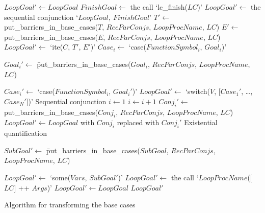 \begin{algorithm}[tbp]
\begin{algorithmic}
    \State $LoopGoal' \gets LoopGoal$
    \State $FinishGoal \gets$ the call `lc\_finish($LC$)'
    \State $LoopGoal' \gets$ the sequential conjunction
      `$LoopGoal,~FinishGoal$'
  \Else
        \State $T' \gets$ put\_barriers\_in\_base\_cases($T$,
          $RecParConjs$, $LoopProcName$, $LC$)
        \State $E' \gets$ put\_barriers\_in\_base\_cases($E$,
          $RecParConjs$, $LoopProcName$, $LC$)
        \State $LoopGoal' \gets$ `ite($C$, $T'$, $E'$)'
      \EndCase
          \State $Case_i \gets$ `case($FunctionSymbol_i$, $Goal_i$)'
          \State \parbox{0.7\textwidth}{
            \begin{tabbing}
              $Goal_i' \gets$ \=put\_barriers\_in\_base\_cases($Goal_i$,
                $RecParConjs$, $LoopProcName$,\\
              \>$LC$)
            \end{tabbing}}
          \State $Case_i' \gets$ `case($FunctionSymbol_i$, $Goal_i'$)'
        \EndFor
        \State $LoopGoal' \gets$ `switch($V$, [$Case_1'$, \ldots, $Case_N'$])'
      \EndCase
        \Comment Sequential conjunction
        \State $i \gets 1$
          \State $i \gets i + 1$
        \EndWhile
        \State $Conj_i' \gets$ put\_barriers\_in\_base\_cases($Conj_i$,
          $RecParConjs$, $LoopProcName$, $LC$)
        \State $LoopGoal' \gets LoopGoal$ with
          $Conj_i$ replaced with $Conj_i'$
      \EndCase
        \Comment Existential quantification
        \State \parbox{0.7\textwidth}{
          \begin{tabbing}
            $SubGoal' \gets$ \=put\_barriers\_in\_base\_cases($SubGoal$,
                $RecParConjs$,\\
            \>$LoopProcName$, $LC$)
          \end{tabbing}}
        \State $LoopGoal' \gets$ `some($Vars$, $SubGoal'$)'
      \EndCase
          \State $LoopGoal' \gets$ the call `$LoopProcName$([$LC$] ++ $Args$)'
        \Else
          \State $LoopGoal' \gets LoopGoal$
        \EndIf
      \EndCase
    \EndSwitch
  \EndIf
  \State \Return $LoopGoal'$
\EndProcedure
\end{algorithmic}
\caption{Algorithm for transforming the base cases}
\label{alg:basecases_alg}
\end{algorithm}


